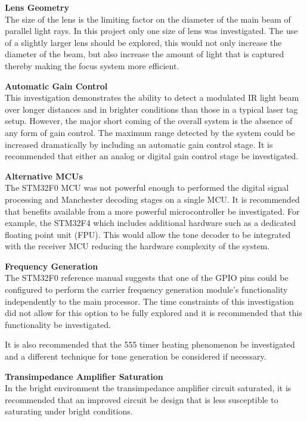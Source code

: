 \textbf{Lens Geometry}\\
The size of the lens is the limiting factor on the diameter of the main beam of parallel light rays. In this project only one size of lens was investigated. The use of a slightly larger lens should be explored, this would not only increase the diameter of the beam, but also increase the amount of light that is captured thereby making the focus system more efficient.

\textbf{Automatic Gain Control}\\
This investigation demonstrates the ability to detect a modulated IR light beam over longer distances and in brighter conditions than those in a typical laser tag setup. However, the major short coming of the overall system is the absence of any form of gain control. The maximum range detected by the system could be increased dramatically by including an automatic gain control stage. It is recommended that either an analog or digital gain control stage be investigated.

\textbf{Alternative MCUs}\\
The STM32F0 MCU was not powerful enough to performed the digital signal processing and Manchester decoding stages on a single MCU. It is recommended that benefits available from a more powerful microcontroller be investigated. For example, the STM32F4 which includes additional hardware such as a dedicated floating point unit (FPU). This would allow the tone decoder to be integrated with the receiver MCU reducing the hardware complexity of the system.

\textbf{Frequency Generation}\\
The STM32F0 reference manual suggests that one of the GPIO pins could be configured to perform the carrier frequency generation module's functionality independently to the main processor. The time constraints of this investigation did not allow for this option to be fully explored and it is recommended that this functionality be investigated.

It is also recommended that the 555 timer heating phenomenon be investigated and a different technique for tone generation be considered if necessary.

\textbf{Transimpedance Amplifier Saturation}\\
In the bright environment the transimpedance amplifier circuit saturated, it is recommended that an improved circuit be design that is less susceptible to saturating under bright conditions.

